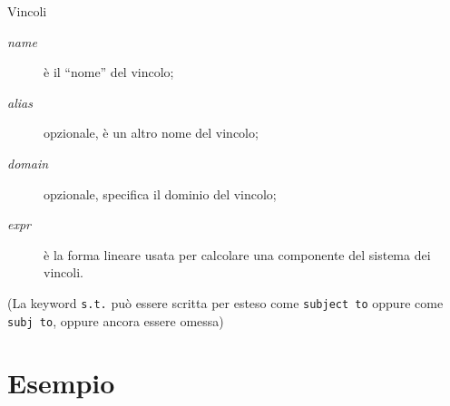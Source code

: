 \documentclass{beamer}
\begin{document}
\begin{frame}[allowframebreaks]{Vincoli}
\noindent
{}

\framebreak

\begin{description}
\item[{\it name}] \`e il ``nome'' del vincolo;

\item[{\it alias}] opzionale, \`e un altro nome del vincolo;

\item[{\it domain}] opzionale, specifica il dominio del vincolo;

\item[{\it expr}] \`e la forma lineare usata per calcolare una componente
del sistema dei vincoli.
\end{description}
\noindent
(La keyword {\tt s.t.} pu\`o essere scritta per esteso come {\tt subject to} oppure come {\tt subj to}, oppure ancora essere omessa)
\end{frame}

\section{Esempio}
\end{document}
